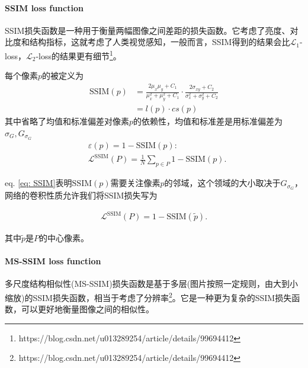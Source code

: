 \documentclass[letterpaper,12pt]{article}
\begin{document}
	\paragraph{SSIM loss function}
	
	SSIM损失函数是一种用于衡量两幅图像之间差距的损失函数。它考虑了亮度、对比度和结构指标，这就考虑了人类视觉感知，一般而言，SSIM得到的结果会比$\mathcal{L}_1$-loss，$\mathcal{L}_2$-loss的结果更有细节\footnote{https://blog.csdn.net/u013289254/article/details/99694412}。
	
	每个像素$p$的被定义为
	\begin{equation}
		\begin{aligned}
			\text{SSIM}(p) &= \frac{2\mu_{x}\mu_{y}+C_{1}}{\mu_{x}^2+\mu_{y}^2+C_{1}} \cdot \frac{2\sigma_{xy}+C_{2}}{\sigma_{x}^2+\sigma_{y}^{2}+C_{2}} \\
			&= l(p)\cdot cs(p)
		\end{aligned}
		\label{eq: SSIM}
	\end{equation}
	其中省略了均值和标准偏差对像素$p$的依赖性，均值和标准差是用标准偏差为$\sigma_G,G_{\sigma_G}$
	\begin{equation}
		\begin{aligned}
			&\varepsilon(p)=1-\text{SSIM}(p): \\  &\mathcal{L}^{\text{SSIM}}(P)=\frac{1}{N}\sum_{p \in P}1-\text{SSIM}(p).
		\end{aligned}
		\label{eq: SSIM loss}
	\end{equation}
	
	eq. \ref{eq: SSIM}表明$\text{SSIM}(p)$需要关注像素$p$的邻域，这个领域的大小取决于$G_{\sigma_G}$，网络的卷积性质允许我们将SSIM损失写为
	
	\begin{equation}
		\begin{aligned}
			\mathcal{L}^{\text{SSIM}}(P)=1-\text{SSIM}(\tilde{p}).
		\end{aligned}
		\label{eq: revised_SSIM loss}
	\end{equation}
	
	其中$\tilde{p}$是$P$的中心像素。
	
	\paragraph{MS-SSIM loss function}
	
	多尺度结构相似性(MS-SSIM)损失函数是基于多层(图片按照一定规则，由大到小缩放)的SSIM损失函数，相当于考虑了分辨率\footnote{https://blog.csdn.net/u013289254/article/details/99694412}。它是一种更为复杂的SSIM损失函数，可以更好地衡量图像之间的相似性。
	
\end{document}

